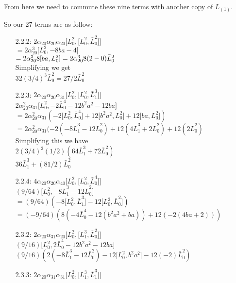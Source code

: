 \documentclass{article}
\newcommand{\lrbrack}[2]{\lbrack #1 , #2 \rbrack}
\begin{document}
From here we need to commute these nine terms with another copy of $L_{(1)}$.  


So our 27 terms are as follow:

\begin{itemize}
\item[2.2.2:] $2\alpha_{20}\alpha_{20}\alpha_{20} \lrbrack{L_0^2}{\lrbrack{L_0^2}{\bar{L}_0^2}}$\\
$ = 2\alpha_{20}^3 \lrbrack{L_0^2}{-8ba-4}$\\
$ = 2\alpha_{20}^3 8\lrbrack{ba}{L_0^2}\\
= 2\alpha_{20}^3 8 (2-0)\bar{L}_0^2$\\
Simplifying we get\\
$32(3/4)^3 \bar{L}_0^2 = 27/2 \bar{L}_0^2$
\item[2.2.3:] $2\alpha_{20}\alpha_{20}\alpha_{31} \lrbrack{L_0^2}{\lrbrack{L_0^2}{\bar{L}_1^3}}$\\
$2\alpha_{20}^2\alpha_{31} \lrbrack{L_0^2}{-2\bar{L}_0^4-12b^2a^2 - 12ba}$\\
$ = 2\alpha_{20}^2\alpha_{31}(-2\lrbrack{L_0^2}{\bar{L}_0^4}+12\lrbrack{b^2a^2}{L_0^2}+ 12\lrbrack{ba}{L_0^2})$\\
$ = 2\alpha_{20}^2\alpha_{31}(-2(-8\bar{L}_1^3-12\bar{L}_0^2) +12(4\bar{L}_1^3 + 2\bar{L}_0^2) +12(2\bar{L}_0^2) $\\
Simplifying this we have\\
$2(3/4)^2(1/2)(64 \bar{L}_1^3 + 72\bar{L}_0^2)$\\
$36 \bar{L}_1^3 + (81/2) \bar{L}_0^2$
\item[2.2.4:] $4\alpha_{20}\alpha_{20}\alpha_{40} \lrbrack{L_0^2}{\lrbrack{L_0^2}{\bar{L}_0^4}}$\\
$(9/64)\lrbrack{L_0^2}{-8\bar{L}_1^3-12\bar{L}_0^2} $\\
$= (9/64)(-8\lrbrack{L_0^2}{\bar{L}_1^3} - 12\lrbrack{L_0^2}{\bar{L}_0^2})$\\
$= (-9/64)(8(-4\bar{L}_0^4-12(b^2a^2+ba)) +12(-2(4ba+2)))$
\item[2.3.2:] $2\alpha_{20}\alpha_{31}\alpha_{20} \lrbrack{L_0^2}{\lrbrack{L_1^3}{\bar{L}_0^2}}$\\
$(9/16)\lrbrack{L_0^2}{2\bar{L}_0^4-12b^2a^2 -12 ba}$\\
$(9/16)(2(-8\bar{L}_1^3-12\bar{L}_0^2) - 12 \lrbrack{L_0^2}{b^2a^2} -12(-2)\bar{L}_0^2)$\\
\item[2.3.3:] $2\alpha_{20}\alpha_{31}\alpha_{31} \lrbrack{L_0^2}{\lrbrack{L_1^3}{\bar{L}_1^3}}$\\

\end{itemize}
\end{document}
